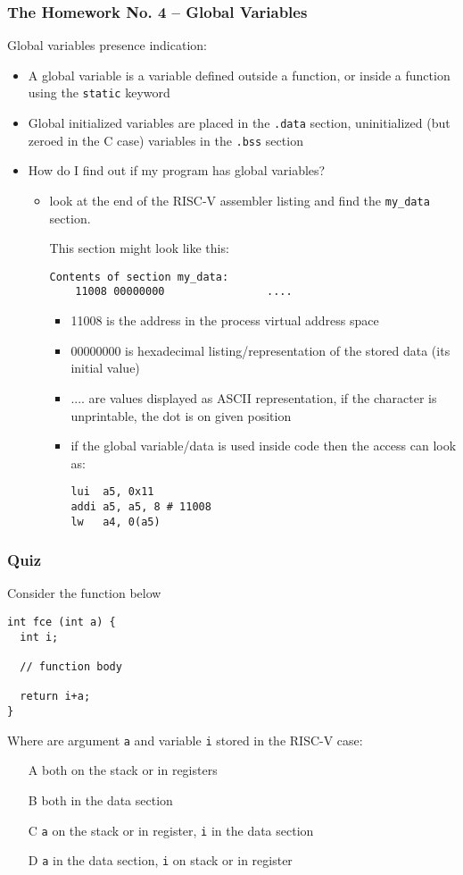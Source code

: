 \documentclass{beamer}
\begin{document}
\begin{frame}[fragile,shrink=5]
\frametitle{The Homework No. 4 -- Global Variables}

Global variables presence indication:
\begin{itemize}
\item A global variable is a variable defined outside a function, or inside a function using the \texttt{static} keyword
\item Global initialized variables are placed in the \texttt{.data} section, uninitialized (but zeroed in the C case) variables in the \texttt{.bss} section
\item How do I find out if my program has global variables?
\begin{itemize}
\item look at the end of the RISC-V assembler listing and find the \texttt{my\_data} section.

This section might look like this:

\begin{verbatim}
Contents of section my_data:
    11008 00000000                ....
\end{verbatim}
\begin{itemize}
 \item 11008 is the address in the process virtual address space
 \item 00000000 is hexadecimal listing/representation of the stored data (its initial value)
 \item .... are values displayed as ASCII representation, if the character is unprintable, the dot is on given position
 \item if the global variable/data is used inside code then the access can look as:
\begin{verbatim}
lui  a5, 0x11
addi a5, a5, 8 # 11008
lw   a4, 0(a5)
\end{verbatim}
 \end{itemize}
 \end{itemize}
 \end{itemize}
\end{frame}


\begin{frame}[fragile]
\frametitle{Quiz}

Consider the function below
\begin{verbatim}
int fce (int a) {
  int i;
  
  // function body
  
  return i+a;
}
\end{verbatim}
Where are argument \texttt{a} and variable \texttt{i} stored in the RISC-V case:
\begin{itemize}
 \item[A] both on the stack or in registers
 \item[B] both in the data section
 \item[C] \texttt{a} on the stack or in register, \texttt{i} in the data section
 \item[D] \texttt{a} in the data section, \texttt{i} on stack or in register
\end{itemize}
\end{frame}
\end{document}
